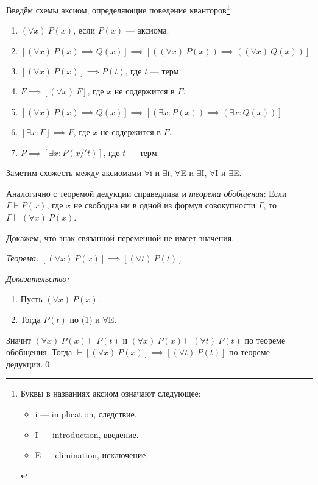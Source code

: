 \newcommand\At{$\forall$i}
\newcommand\Ai{$\forall$I}
\newcommand\Ae{$\forall$E}
\newcommand\Et{$\exists$i}
\newcommand\Ei{$\exists$I}
\newcommand\Ee{$\exists$E}
Введём схемы аксиом, определяющие поведение кванторов\footnote{
  Буквы в названиях аксиом означают следующее:
  \begin{itemize}
    \item{}i --- implication, следствие.
    \item{}I --- introduction, введение.
    \item{}E --- elimination, исключение.
  \end{itemize}
}.
\begin{enumerate}[label=Q\arabic*]
  \item[($\forall$A)]{}$(\forall x)~P(x)$, если $P(x)$ --- аксиома.
  \item[(\At{})]{}$[(\forall x)~P(x)\implies Q(x)]\implies
    [((\forall x)~P(x))\implies ((\forall x)~Q(x))]$
  \item[(\Ae{})]{}$[(\forall x)~P(x)]\implies P(t)$, где $t$ --- терм.
  \item[(\Ai{})]{}$F\implies [(\forall x)~F]$, где $x$ не содержится в $F$.
  \item[(\Et{})]{}$[(\forall x)~P(x)\implies Q(x)]\implies
    [(\exists x:P(x))\implies (\exists x:Q(x))]$
  \item[(\Ee{})]{}$[\exists x:F]\implies F$, где $x$ не содержится в $F$.
  \item[(\Ei{})]{}$P\implies [\exists x:P(x/'t)]$, где $t$ --- терм.
\end{enumerate}
Заметим схожесть между аксиомами \At{} и \Et{},
\Ae{} и \Ei{}, \Ai{} и \Ee{}.

Аналогично с теоремой дедукции справедлива и {\it теорема обобщения}:
Если $\Gamma\vdash P(x)$, где $x$ не свободна ни в одной из формул
совокупности $\Gamma$, то $\Gamma\vdash (\forall x)~P(x)$.

Докажем, что знак связанной переменной не имеет значения.

{\it Теорема:}
$[(\forall x)~P(x)]\implies [(\forall t)~P(t)]$

{\it Доказательство:}
\begin{enumerate}[label=(\arabic*)]
  \item{}Пусть $(\forall x)~P(x)$.
  \item{}Тогда $P(t)$ по (1) и \Ae{}.
\end{enumerate}
Значит $(\forall x)~P(x)\vdash P(t)$ и $(\forall x)~P(x)\vdash (\forall t)~P(t)$
по теореме обобщения. Тогда ${\vdash [(\forall x)~P(x)]\implies [(\forall t)~P(t)]}$
по теореме дедукции.\qed

